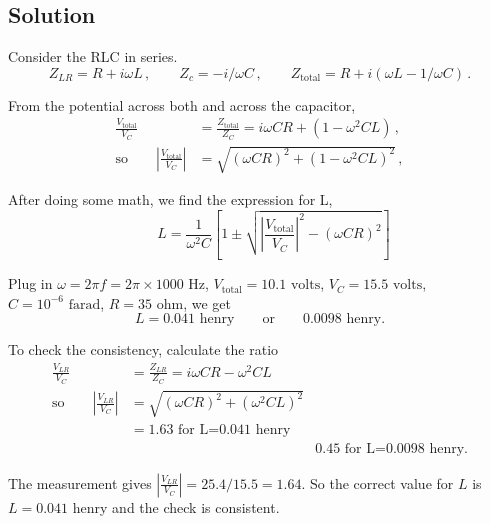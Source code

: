 \documentclass[solutions]{esg8022pset}
\begin{document}
\subsection{Solution}
  Consider the RLC in series.
  \begin{equation}
  Z_{LR}=R+i\omega L\,,\qquad Z_c=-i/\omega C\,,\qquad
  Z_{\text{total}}=R+i(\omega L-1/\omega C)\,.
  \end{equation}

  From the potential across both and across the capacitor,
  \begin{align}
  \frac{V_{\text{total}}}{V_C}& =\frac{Z_{\text{total}}}{Z_C}=i\omega
  CR+(1-\omega^2 CL)\,,\\
  \text{so}\qquad \left| \frac{V_{\text{total}}}{V_C}\right| & =
  \sqrt{(\omega CR)^2+(1-\omega^2 CL)^2}\,,
  \end{align}

  After doing some math, we find the expression for L,
  \begin{equation}
  \qquad L = \frac{1}{\omega^2 C}\left[
  1\pm \sqrt{\left|\frac{V_{\text{total}}}{V_C}\right|^2-(\omega CR)^2}
  \right]
  \end{equation}

  Plug in $\omega=2\pi f=2\pi\times 1000\text{ Hz}$,
  $V_{\text{total}}=10.1\text{ volts}$, $V_C=15.5\text{ volts}$,
  $C=10^{-6}\text{ farad}$, $R=35\text{ ohm}$, we get
  \[ L= 0.041 \text{ henry}\qquad\text{or}\qquad 0.0098\text{ henry}.\]

  To check the consistency, calculate the ratio
  \begin{align}
  \frac{V_{LR}}{V_C}& =\frac{Z_{LR}}{Z_C}=i\omega CR-\omega^2 CL\\
  \text{so}\qquad \left|\frac{V_{LR}}{V_C}\right| & = \sqrt{(\omega
  CR)^2+(\omega^2 CL)^2}\\
  & = 1.63 \text{ for L=0.041 henry}\nonumber\\
  & & 0.45\text{ for L=0.0098 henry}.
  \end{align}

  The measurement gives $\left|\frac{V_{LR}}{V_C}\right| =
  25.4/15.5=1.64$.  So the correct value for $L$ is $L=0.041$ henry and the
  check is consistent.
\end{document}
